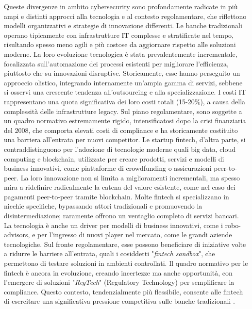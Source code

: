Queste divergenze in ambito cybersecurity sono profondamente radicate in più ampi e distinti approcci alla tecnologia e al contesto regolamentare, che riflettono modelli organizzativi e strategie di innovazione differenti.
Le banche tradizionali operano tipicamente con infrastrutture IT complesse e stratificate nel tempo, risultando spesso meno agili e più costose da aggiornare rispetto alle soluzioni moderne. La loro evoluzione tecnologica è stata prevalentemente incrementale, focalizzata sull'automazione dei processi esistenti per migliorare l'efficienza, piuttosto che su innovazioni disruptive. Storicamente, esse hanno perseguito un approccio olistico, integrando internamente un'ampia gamma di servizi, sebbene si osservi una crescente tendenza all'outsourcing e alla specializzazione. I costi IT rappresentano una quota significativa dei loro costi totali (15-20\%), a causa della complessità delle infrastrutture legacy. Sul piano regolamentare, sono soggette a un quadro normativo estremamente rigido, intensificatosi dopo la crisi finanziaria del 2008, che comporta elevati costi di compliance e ha storicamente costituito una barriera all'entrata per nuovi competitor.
Le startup fintech, d'altra parte, si contraddistinguono per l'adozione di tecnologie moderne quali big data, cloud computing e blockchain, utilizzate per creare prodotti, servizi e modelli di business innovativi, come piattaforme di crowdfunding o assicurazioni peer-to-peer. La loro innovazione non si limita a miglioramenti incrementali, ma spesso mira a ridefinire radicalmente la catena del valore esistente, come nel caso dei pagamenti peer-to-peer tramite blockchain. Molte fintech si specializzano in nicchie specifiche, bypassando attori tradizionali e promuovendo la disintermediazione; raramente offrono un ventaglio completo di servizi bancari. La tecnologia è anche un driver per modelli di business innovativi, come i robo-advisors, e per l'ingresso di nuovi player nel mercato, come le grandi aziende tecnologiche. Sul fronte regolamentare, esse possono beneficiare di iniziative volte a ridurre le barriere all'entrata, quali i cosiddetti "\textit{fintech sandbox}", che permettono di testare soluzioni in ambienti controllati. Il quadro normativo per le fintech è ancora in evoluzione, creando incertezze ma anche opportunità, con l'emergere di soluzioni "\textit{RegTech}" (Regulatory Technology) per semplificare la compliance. Questo contesto, tendenzialmente più flessibile, consente alle fintech di esercitare una significativa pressione competitiva sulle banche tradizionali \cite{puschmann_fintech_2017}.

